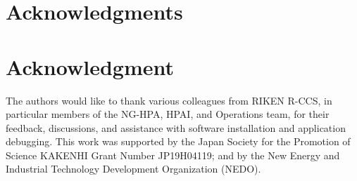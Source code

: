 \documentclass[conference,compsoc]{IEEEtran}
\begin{document}



\ifCLASSOPTIONcompsoc
  \section*{Acknowledgments}
\else
  \section*{Acknowledgment}
\fi

The authors would like to thank various colleagues from RIKEN R-CCS, in particular members of the NG-HPA, HPAI, and 
Operations team, for their feedback, discussions, and assistance with software installation and application debugging.
This work was supported by the Japan Society for the Promotion of Science KAKENHI Grant Number JP19H04119;
and by the New Energy and Industrial Technology Development Organization (NEDO).




\end{document}
